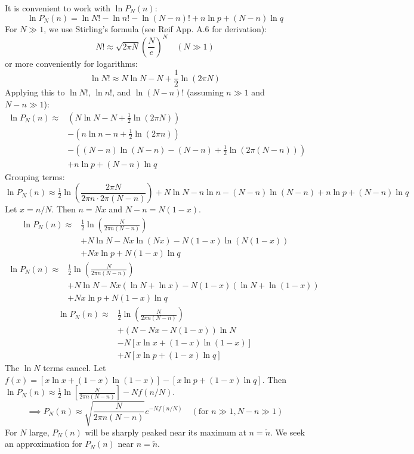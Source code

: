 \documentclass[11pt]{article}
\begin{document}
It is convenient to work with $\ln P_N(n)$:
\[ \ln P_N(n) = \ln N! - \ln n! - \ln(N-n)! + n \ln p + (N-n) \ln q \]
For $N \gg 1$, we use Stirling's formula (see Reif App. A.6 for derivation):
\[ N! \approx \sqrt{2\pi N} \left(\frac{N}{e}\right)^N \quad (N \gg 1) \]
or more conveniently for logarithms:
\[ \ln N! \approx N \ln N - N + \frac{1}{2} \ln(2\pi N) \]
Applying this to $\ln N!$, $\ln n!$, and $\ln (N-n)!$ (assuming $n \gg 1$ and $N-n \gg 1$):
\begin{align*} \label{eq:lnPN_stirling} \ln P_N(n) \approx & \left(N \ln N - N + \tfrac{1}{2}\ln(2\pi N)\right) \\ &- \left(n \ln n - n + \tfrac{1}{2}\ln(2\pi n)\right) \\ &- \left((N-n) \ln(N-n) - (N-n) + \tfrac{1}{2}\ln(2\pi(N-n))\right) \\ &+ n \ln p + (N-n) \ln q \end{align*} 
Grouping terms:
\[ \ln P_N(n) \approx \tfrac{1}{2} \ln\left(\frac{2\pi N}{2\pi n \cdot 2\pi (N-n)}\right) + N\ln N - n\ln n - (N-n)\ln(N-n) + n\ln p + (N-n)\ln q \]
Let $x = n/N$. Then $n=Nx$ and $N-n = N(1-x)$.
\begin{align*} \ln P_N(n) \approx & \tfrac{1}{2} \ln\left(\frac{N}{2\pi n (N-n)}\right) \\ &+ N\ln N - Nx\ln(Nx) - N(1-x)\ln(N(1-x)) \\ &+ Nx\ln p + N(1-x)\ln q \end{align*}
\begin{align*} \ln P_N(n) \approx & \tfrac{1}{2} \ln\left(\frac{N}{2\pi n (N-n)}\right) \\ &+ N\ln N - Nx(\ln N + \ln x) - N(1-x)(\ln N + \ln(1-x)) \\ &+ Nx\ln p + N(1-x)\ln q \end{align*}
\begin{align*} \ln P_N(n) \approx & \tfrac{1}{2} \ln\left(\frac{N}{2\pi n (N-n)}\right) \\ &+ (N - Nx - N(1-x))\ln N \\ &-N[x\ln x + (1-x)\ln(1-x)] \\ &+ N[x\ln p + (1-x)\ln q] \end{align*}
The $\ln N$ terms cancel. Let $f(x) = [x\ln x + (1-x)\ln(1-x)] - [x\ln p + (1-x)\ln q]$.
Then $\ln P_N(n) \approx \frac{1}{2} \ln\left[\frac{N}{2\pi n (N-n)}\right] - N f(n/N)$.
\[ \implies P_N(n) \approx \sqrt{\frac{N}{2\pi n (N-n)}} e^{-N f(n/N)} \quad (\text{for } n \gg 1, N-n \gg 1) \]
For $N$ large, $P_N(n)$ will be sharply peaked near its maximum at $n=\tilde{n}$. We seek an approximation for $P_N(n)$ near $n=\tilde{n}$.
\end{document}

